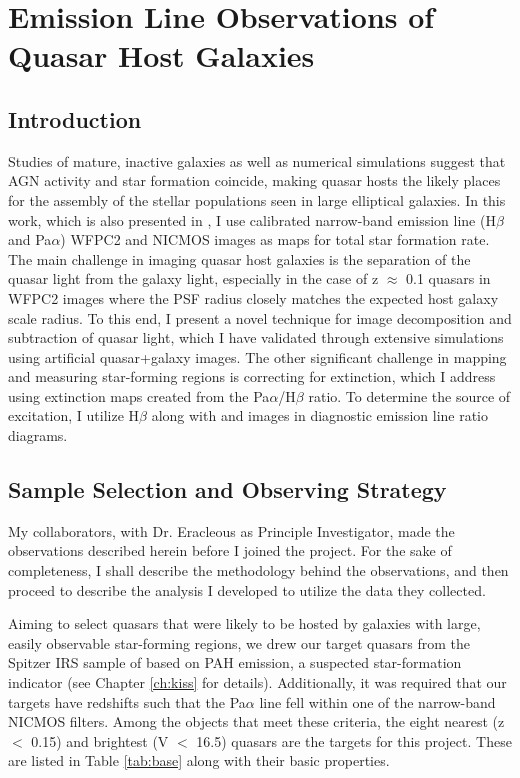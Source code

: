 \chapter{Emission Line Observations of Quasar Host Galaxies}

\section{Introduction}
\label{sec:quasar-intro}

Studies of mature, inactive galaxies as well as numerical simulations suggest that AGN activity and star formation coincide, making quasar hosts the likely places for the assembly of the stellar populations seen in large elliptical galaxies.  In this work, which is also presented in \cite{Young2}, I use calibrated narrow-band emission line (H$\beta$ and Pa$\alpha$) WFPC2 and NICMOS images as maps for total star formation rate.  The main challenge in imaging quasar host galaxies is the separation of the quasar light from the galaxy light, especially in the case of z $\approx$ 0.1 quasars in WFPC2 images where the PSF radius closely matches the expected host galaxy scale radius.  To this end, I present a novel technique for image decomposition and subtraction of quasar light, which I have validated through extensive simulations using artificial quasar+galaxy images.  The other significant challenge in mapping and measuring star-forming regions is correcting for extinction, which I address using extinction maps created from the Pa$\alpha$/H$\beta$  ratio.  To determine the source of excitation, I utilize H$\beta$ along with  and  images in diagnostic emission line ratio diagrams.

\section{Sample Selection and Observing Strategy}
\label{sec:selection}

My collaborators, with Dr. Eracleous as Principle Investigator, made the observations described herein before I joined the project.  For the sake of completeness, I shall describe the methodology behind the observations, and then proceed to describe the analysis I developed to utilize the data they collected.

Aiming to select quasars that were likely to be hosted by galaxies with large, easily observable star-forming regions, we drew our target quasars from the Spitzer IRS sample of \cite{Schweitzer} based on PAH emission, a suspected star-formation indicator (see Chapter \ref{ch:kiss} for details). Additionally, it was required that our targets have redshifts such that the Pa$\alpha$ line fell within one of the narrow-band NICMOS filters. Among the objects that meet these criteria, the eight nearest (z $<$ 0.15) and brightest (V $<$ 16.5) quasars are the targets for this project.  These are listed in Table \ref{tab:base} along with their basic properties.

